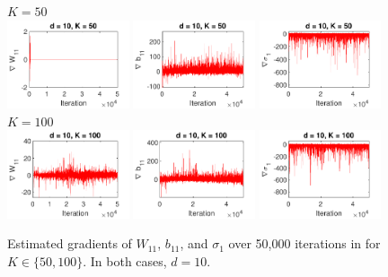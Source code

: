 \documentclass[10pt]{article}
\begin{document}
\begin{figure}[p!]
\centering
$K=50$ \\
\includegraphics[width=0.32\textwidth,trim={0 23 0 11.5},clip]{images/bananaND_sivi_gW11_d10_K50.pdf}
\includegraphics[width=0.32\textwidth,trim={0 23 0 11.5},clip]{images/bananaND_sivi_gb11_d10_K50.pdf}
\includegraphics[width=0.32\textwidth,trim={0 23 0 11.5},clip]{images/bananaND_sivi_gsigma1_d10_K50.pdf}
\\
$K=100$ \\
\includegraphics[width=0.32\textwidth,trim={0 0 0 11.5},clip]{images/bananaND_sivi_gW11_d10_K100.pdf}
\includegraphics[width=0.32\textwidth,trim={0 0 0 11.5},clip]{images/bananaND_sivi_gb11_d10_K100.pdf}
\includegraphics[width=0.32\textwidth,trim={0 0 0 11.5},clip]{images/bananaND_sivi_gsigma1_d10_K100.pdf}
\caption{Estimated gradients of $W_{11}$, $b_{11}$, and $\sigma_1$ over 50,000 \sgd iterations in \sivi for $K\in\{50,100\}$. In both cases, $d=10$.}
\label{fig:siviresults}
\end{figure}
\end{document}
